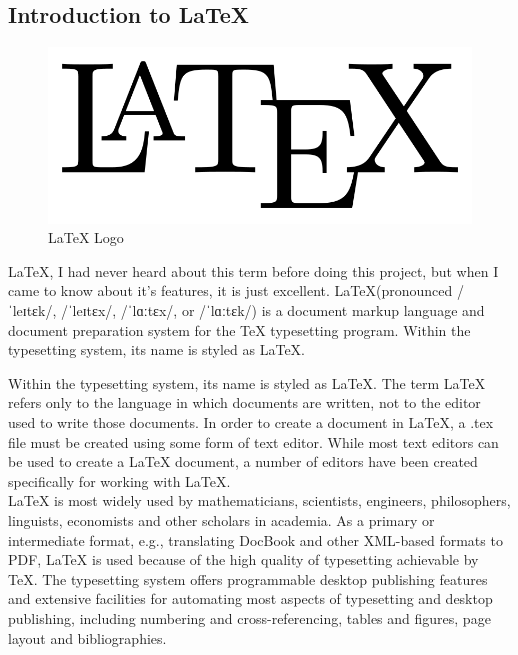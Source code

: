 \subsection{Introduction to \LaTeX}
\begin{figure}[ht]
\centering
\includegraphics[scale=0.2]{images/latex.png}
\caption{\LaTeX{} Logo}
\end{figure}
\hspace{-1.8em} \LaTeX{}, I had never heard about this term before doing this project,
but when I came to know about it's features, it is just excellent. 
\LaTeX (pronounced /ˈleɪtɛk/, /ˈleɪtɛx/, /ˈlɑːtɛx/, or /ˈlɑːtɛk/) is a 
document markup language and document preparation system for the \TeX{} 
typesetting  program. Within the typesetting system, its name is styled 
as \LaTeX.

\hspace{-1.8em} Within the typesetting system, its name is styled as \LaTeX. The term 
\LaTeX{} refers only to the language in which documents are written, 
not to the editor used to write those documents. In order to create a 
document in \LaTeX, a .tex file must be created using some form of text 
editor. While most text editors can be used to create a \LaTeX{} document, 
a number of editors have been created specifically for working with \LaTeX.\\

\noindent\LaTeX{} is most widely used by mathematicians, scientists, 
engineers, philosophers, linguists, economists and other scholars in 
academia. As a primary or intermediate format, e.g., translating DocBook 
and other XML-based formats to PDF, \LaTeX{} is used because of the 
high quality of typesetting achievable by \TeX. The typesetting system 
offers programmable desktop publishing features and extensive facilities 
for automating most aspects of typesetting and desktop publishing, 
including numbering and cross-referencing, tables and figures, 
page layout and bibliographies.\\

